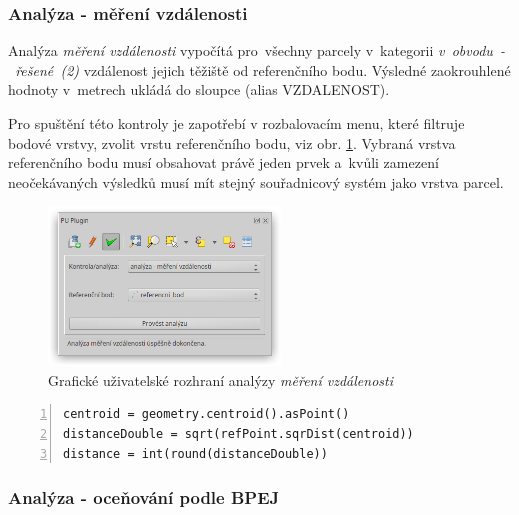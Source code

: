 \subsubsection{Analýza - měření vzdálenosti}
\label{analyza_vzdalenosti}

Analýza \textit{měření vzdálenosti} vypočítá pro~všechny parcely v~kategorii \textit{v~obvodu~-~řešené~(2)} vzdálenost jejich těžiště od referenčního bodu. Výsledné zaokrouhlené hodnoty v~metrech ukládá do sloupce  (alias VZDALENOST).

Pro spuštění této kontroly je zapotřebí v rozbalovacím menu, které filtruje bodové vrstvy, zvolit vrstu referenčního bodu, viz obr. \ref{fig:analyza_vzdalenosti_gui}. Vybraná vrstva referenčního bodu musí obsahovat právě jeden prvek a~kvůli zamezení neočekávaných výsledků musí mít stejný souřadnicový systém jako vrstva parcel.

	\begin{figure}[H]
		\centering
		\includegraphics[width=0.55\textwidth]{./pictures/analyza_vzdalenost.png}
		\caption[Grafické uživatelské rozhraní analýzy \textit{měření vzdálenosti}]{Grafické uživatelské rozhraní analýzy \textit{měření vzdálenosti}}
		\label{fig:analyza_vzdalenosti_gui}
 	\end{figure}

{\scriptsize
\begin{lstlisting}[style=python, caption={Výpočet vzdálenosti težiště parcely od refenčního bodu}, captionpos=b, label=vypocet_vzdalenosti_teziste_parcely_od_ref_bodu, backgroundcolor = \color{light-gray},  numbers=left]
centroid = geometry.centroid().asPoint()
distanceDouble = sqrt(refPoint.sqrDist(centroid))
distance = int(round(distanceDouble))
\end{lstlisting}}

\subsubsection{Analýza - oceňování podle BPEJ}
\label{analyza_bpej}

